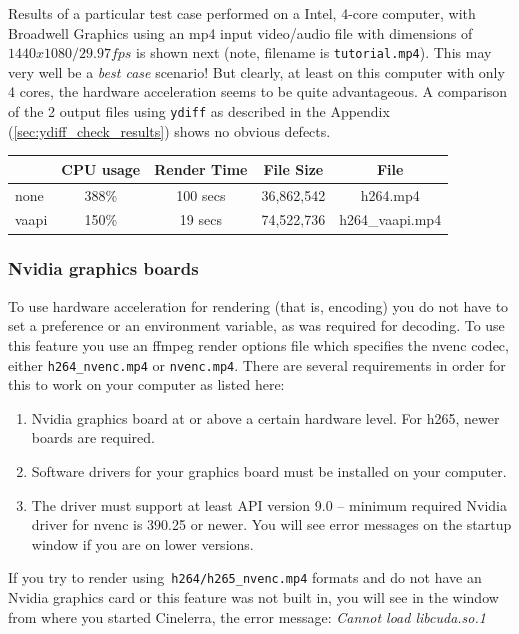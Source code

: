 Results of a particular test case performed on a Intel, 4-core computer, with Broadwell Graphics using an mp4 input video/audio file with dimensions of
$1440x1080 / 29.97fps$ is shown next (note, filename is \texttt{tutorial.mp4}).  This may very well be a \textit{best case} scenario!  But clearly, at least on this computer with only 4 cores, the hardware acceleration seems to be quite advantageous.  A comparison of the 2 output files 
using \texttt{ydiff} as described in the Appendix (\ref{sec:ydiff_check_results}) shows no obvious defects.

\begin{center}
	\begin{tabular}{l|cccc}
		&CPU usage & Render Time & File Size & File \\
		\hline
		none & 388\% &100 secs &36,862,542 & h264.mp4 \\
		vaapi & 150\% & 19 secs & 74,522,736 & h264\_vaapi.mp4 \\
	\end{tabular}
\end{center}

\subsubsection*{Nvidia graphics boards}%
\label{ssub:nvidia_graphics_card}

To use hardware acceleration for rendering (that is, encoding) you do not have to set a preference or an environment variable, as was required for decoding.  To use this feature you use an ffmpeg render options file which specifies the nvenc codec, either \texttt{h264\_nvenc.mp4} or \texttt{nvenc.mp4}.  There are several requirements in order for this to work on your computer as listed here:

\begin{enumerate}
	\item Nvidia graphics board at or above a certain hardware level.  For h265, newer boards are required.
	\item Software drivers for your graphics board must be installed on your computer.
	\item The driver must support at least API version 9.0 -- minimum required Nvidia driver for nvenc is
	390.25 or newer.  You will see error messages on the startup window if you are on lower versions.
\end{enumerate}

If you try to render using\texttt{ h264/h265\_nvenc.mp4} formats and do not have an Nvidia graphics card or this feature was not built in, you will see in the window from where you started Cinelerra, the error message: \qquad \textit{Cannot load libcuda.so.1}

